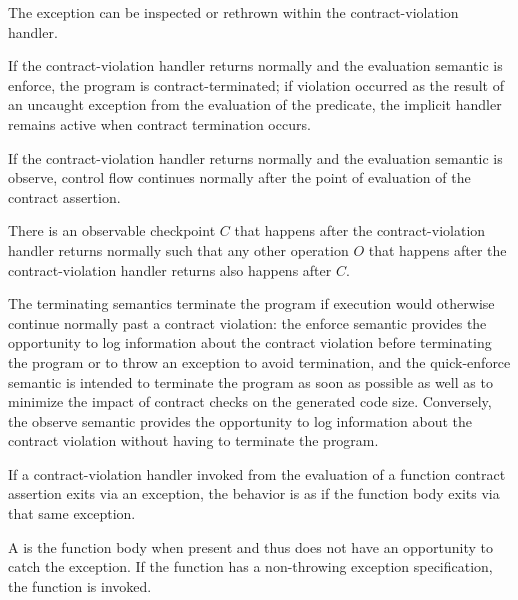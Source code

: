 \begin{note}
The exception can be inspected or rethrown within the contract-violation handler.
\end{note}

\pnum
{}%
If the contract-violation handler
returns normally
and the evaluation semantic is enforce,
the program is contract-terminated;
if violation occurred
as the result of an uncaught exception
from the evaluation of the predicate,
the implicit handler
remains active when contract termination occurs.

\pnum
{}%
\begin{note}
If the contract-violation handler
returns normally
and the evaluation semantic is observe,
control flow continues normally
after the point of evaluation of the contract assertion.
\end{note}

\pnum
There is an observable checkpoint $C$
that happens after the contract-violation handler returns normally
such that any other operation $O$
that happens after the contract-violation handler returns
also happens after $C$.

\pnum
\begin{note}
The terminating semantics terminate the program
if execution would otherwise continue normally
past a contract violation:
the enforce semantic provides the opportunity to
log information about the contract violation
before terminating the program
or to throw an exception to avoid termination,
and the quick-enforce semantic is intended
to terminate the program as soon as possible
as well as
to minimize the impact of contract checks
on the generated code size.
Conversely,
the observe semantic
provides the opportunity to
log information about the contract violation
without having to terminate the program.
\end{note}

\pnum
If a contract-violation handler
invoked from the evaluation of a function contract assertion
exits via an exception,
the behavior is as if
the function body exits via that same exception.
\begin{note}
A 
is the function body when present
and thus does not
have an opportunity to catch the exception.
If the function
has a non-throwing exception specification,
the function  is invoked.
\end{note}

